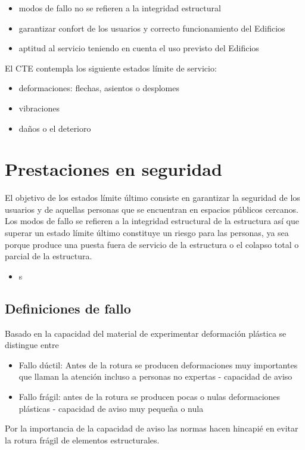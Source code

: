 \begin{itemize}
    \item modos de fallo no se refieren a la integridad estructural
    \item garantizar confort de los usuarios y correcto funcionamiento del Edificios
    \item aptitud al servicio teniendo en cuenta el uso previsto del Edificios
\end{itemize}

El CTE contempla los siguiente estados límite de servicio:
\begin{itemize}
    \item deformaciones: flechas, asientos o desplomes
    \item vibraciones
    \item daños o el deterioro
\end{itemize}

\section{Prestaciones en seguridad}

El objetivo de los estados límite último consiste en garantizar la seguridad de los usuarios y de aquellas personas que se encuentran en espacios públicos cercanos. Los modos de fallo se refieren a la integridad estructural de la estructura así que superar un estado límite último constituye un riesgo para las personas, ya sea porque produce una puesta fuera de servicio de la estructura o el colapso total o parcial de la estructura.
\begin{itemize}
    \item s
\end{itemize}

\subsection{Definiciones de fallo}
Basado en la capacidad del material de experimentar deformación plástica se distingue entre 
\begin{itemize}
    \item Fallo dúctil: Antes de la rotura se producen deformaciones muy importantes que llaman la atención incluso a personas no expertas - capacidad de aviso
    \item Fallo frágil: antes de la rotura se producen pocas o nulas deformaciones plásticas - capacidad de aviso muy pequeña o nula
\end{itemize}
Por la importancia de la capacidad de aviso las normas hacen hincapié en evitar la rotura frágil de elementos estructurales.

